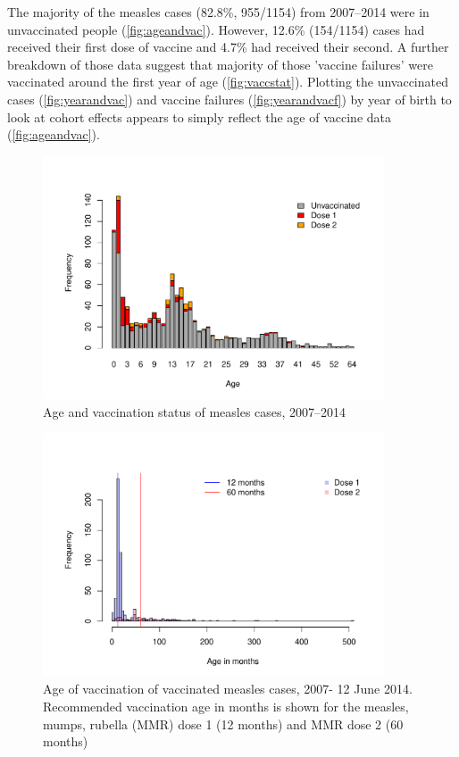 \documentclass{article}
\begin{document}
The majority of the measles cases (82.8\%, 955/1154) from 2007--2014 were in unvaccinated people (\autoref{fig:ageandvac}). However, 12.6\% (154/1154) cases had received their first dose of vaccine and 4.7\% had received their second. A further breakdown of those data suggest that majority of those 'vaccine failures' were vaccinated around the first year of age (\autoref{fig:vaccstat}). Plotting the unvaccinated cases (\autoref{fig:yearandvac}) and vaccine failures (\autoref{fig:yearandvacf}) by year of birth to look at cohort effects appears to simply reflect the age of vaccine data (\autoref{fig:ageandvac}).

\begin{figure}
\begin{center}
     \includegraphics[width=0.9\textwidth]{vacc_status.pdf}
\end{center}
\caption{Age and vaccination status of measles cases, 2007--2014}
\label{fig:ageandvac}
\end{figure}

\begin{figure}
\begin{center}
     \includegraphics[width=0.9\textwidth]{vacc_age.pdf}
\end{center}
\caption{Age of vaccination of vaccinated measles cases, 2007- 12 June 2014. Recommended vaccination age in months is shown for the measles, mumps, rubella (MMR) dose 1 (12 months) and MMR dose 2 (60 months)}
\label{fig:vaccstat}
\end{figure}
\end{document}
